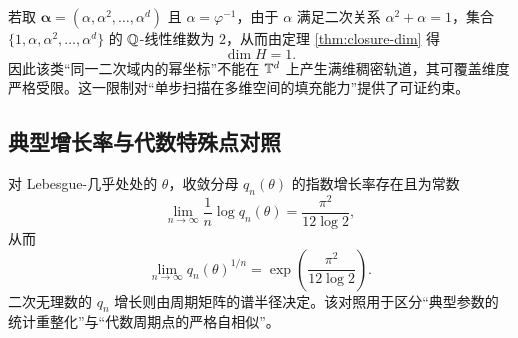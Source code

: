 若取 $\boldsymbol{\alpha}=(\alpha,\alpha^2,\dots,\alpha^d)$ 且 $\alpha=\varphi^{-1}$，由于 $\alpha$ 满足二次关系 $\alpha^2+\alpha=1$，集合 $\{1,\alpha,\alpha^2,\dots,\alpha^d\}$ 的 $\mathbb{Q}$-线性维数为 $2$，从而由定理 \ref{thm:closure-dim} 得
\[
\dim H=1.
\]
因此该类“同一二次域内的幂坐标”不能在 $\mathbb{T}^d$ 上产生满维稠密轨道，其可覆盖维度严格受限。这一限制对“单步扫描在多维空间的填充能力”提供了可证约束。

\subsection{典型增长率与代数特殊点对照}

对 Lebesgue-几乎处处的 $\theta$，收敛分母 $q_n(\theta)$ 的指数增长率存在且为常数
\[
\lim_{n\to\infty}\frac{1}{n}\log q_n(\theta)=\frac{\pi^2}{12\log 2},
\]
从而
\[
\lim_{n\to\infty} q_n(\theta)^{1/n}=\exp\!\left(\frac{\pi^2}{12\log 2}\right).
\]
二次无理数的 $q_n$ 增长则由周期矩阵的谱半径决定。该对照用于区分“典型参数的统计重整化”与“代数周期点的严格自相似”。

